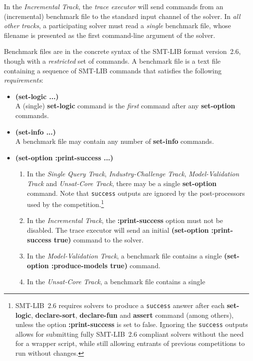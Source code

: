 \documentclass[12pt]{article}
\newcommand{\akey}[1]{\textbf{#1}\xspace}
\newcommand{\bkey}[1]{\textbf{{#1}}\xspace}
\newcommand{\maintrack}{Single Query Track\xspace}
\newcommand{\inctrack}{Incremental Track\xspace}
\newcommand{\ucoretrack}{Unsat-Core Track\xspace}
\newcommand{\mvaltrack}{Model-Validation Track\xspace}
\newcommand{\challtrack}{Industry-Challenge Track\xspace}
\begin{document}
%
In the \emph{\inctrack}, the \emph{trace executor} will send commands from an
(incremental) benchmark file to the standard input channel of the solver.  In
\emph{all other tracks}, a participating solver must read a \emph{single}
benchmark file, whose filename is presented as the first command-line argument
of the solver.

Benchmark files are in the concrete syntax of the SMT-LIB format
version~2.6, though with a \emph{restricted} set of commands.  A benchmark
file is a text file containing a sequence of SMT-LIB commands that
satisfies the following \emph{requirements}:
%
\begin{itemize}
  \item \bkey{(set-logic ...)}\\
    A (single) \akey{set-logic} command is the \emph{first} command after
    any \akey{set-option} commands.
  \item \bkey{(set-info ...)}\\
    A benchmark file may contain any number of \akey{set-info} commands.
  \item
    \bkey{(set-option :print-success ...)}
    \begin{enumerate}[label=(\alph*)]
      \vspace{-1ex}
    \item In the \emph{\maintrack}, \emph{\challtrack}, \emph{\mvaltrack} and
        \emph{\ucoretrack}, there may be a single \akey{set-option} command.
        Note that \texttt{success} outputs are ignored by the post-processors
        used by the competition.\footnote{SMT-LIB~2.6 requires solvers to
        produce a \texttt{success} answer after each \akey{set-logic},
        \akey{declare-sort}, \akey{declare-fun} and \akey{assert} command
        (among others), unless the option \akey{:print-success} is set to
        false.  Ignoring the \texttt{success} outputs allows for submitting
        fully SMT-LIB~2.6 compliant solvers without the need for a wrapper
        script, while still allowing entrants of previous competitions to run
        without changes.}
      \item In the \emph{\inctrack}, the \akey{:print-success} option
        must not be disabled.  The trace executor will send an initial
        \akey{(set-option :print-success true)} command to the solver.
      \item In the \emph{\mvaltrack}, a benchmark file contains a single
        \akey{(set-option :produce-models true)} command.
      \item In the \emph{\ucoretrack}, a benchmark file contains a single

\end{enumerate}
\end{itemize}
\end{document}

